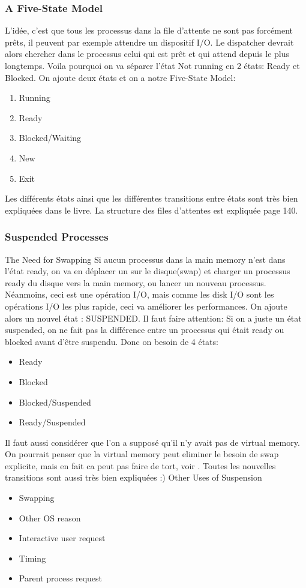 \subsubsection{A Five-State Model}
L'idée, c'est que tous les processus dans la file d'attente ne sont pas forcément prêts, il peuvent par exemple attendre un dispositif I/O.
Le dispatcher devrait alors chercher dans le processus celui qui est prêt et qui attend depuis le plus longtemps.
Voila pourquoi on va séparer l'état Not running en 2 états: Ready et Blocked.
On ajoute deux états et on a notre Five-State Model:
\begin{enumerate}
  \item Running
  \item Ready
  \item Blocked/Waiting
  \item New
  \item Exit
\end{enumerate}
Les différents états ainsi que les différentes transitions entre états sont très bien expliquées dans le livre.
La structure des files d'attentes est expliquée page 140.

\subsubsection{Suspended Processes}
The Need for Swapping
Si aucun processus dans la main memory n'est dans l'état ready, on va en déplacer un sur le disque(swap) et charger un processus ready du disque vers la main memory, ou lancer un nouveau processus.
Néanmoins, ceci est une opération I/O, mais comme les disk I/O sont les opérations I/O les plus rapide, ceci va améliorer les performances.
On ajoute alors un nouvel état : SUSPENDED.
Il faut faire attention: Si on a juste un état suspended, on ne fait pas la différence entre un processus qui était ready ou blocked avant d'être suspendu.
Donc on besoin de 4 états:
\begin{itemize}
  \item Ready
  \item Blocked
  \item Blocked/Suspended
  \item Ready/Suspended
\end{itemize}
Il faut aussi considérer que l'on a supposé qu'il n'y avait pas de virtual memory.
On pourrait penser que la virtual memory peut eliminer le besoin de swap explicite, mais en fait ca peut pas faire de tort, voir \cite[p.~142]{stallings}.
Toutes les nouvelles transitions sont aussi très bien expliquées :)
Other Uses of Suspension
\begin{itemize}
  \item Swapping
  \item Other OS reason
  \item Interactive user request
  \item Timing
  \item Parent process request
\end{itemize}

